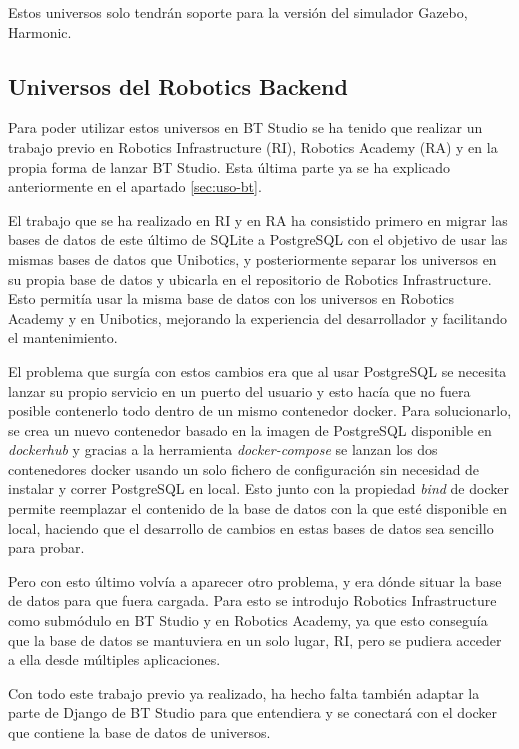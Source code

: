 Estos universos solo tendrán soporte para la versión del simulador Gazebo, Harmonic.

\subsection{Universos del Robotics Backend}

Para poder utilizar estos universos en BT Studio se ha tenido que realizar un trabajo previo en Robotics Infrastructure (RI), Robotics Academy (RA) y en la propia forma de lanzar BT Studio. Esta última parte ya se ha explicado anteriormente en el apartado \ref{sec:uso-bt}.

El trabajo que se ha realizado en RI y en RA ha consistido primero en migrar las bases de datos de este último de SQLite a PostgreSQL con el objetivo de usar las mismas bases de datos que Unibotics, y posteriormente separar los universos en su propia base de datos y ubicarla en el repositorio de Robotics Infrastructure. Esto permitía usar la misma base de datos con los universos en Robotics Academy y en Unibotics, mejorando la experiencia del desarrollador y facilitando el mantenimiento.

El problema que surgía con estos cambios era que al usar PostgreSQL se necesita lanzar su propio servicio en un puerto del usuario y esto hacía que no fuera posible contenerlo todo dentro de un mismo contenedor docker. Para solucionarlo, se crea un nuevo contenedor basado en la imagen de PostgreSQL disponible en \textit{dockerhub} y gracias a la herramienta \textit{docker-compose} se lanzan los dos contenedores docker usando un solo fichero de configuración sin necesidad de instalar y correr PostgreSQL en local. Esto junto con la propiedad \textit{bind} de docker permite reemplazar el contenido de la base de datos con la que esté disponible en local, haciendo que el desarrollo de cambios en estas bases de datos sea sencillo para probar.

Pero con esto último volvía a aparecer otro problema, y era dónde situar la base de datos para que fuera cargada. Para esto se introdujo Robotics Infrastructure como submódulo en BT Studio y en Robotics Academy, ya que esto conseguía que la base de datos se mantuviera en un solo lugar, RI, pero se pudiera acceder a ella desde múltiples aplicaciones.

Con todo este trabajo previo ya realizado, ha hecho falta también adaptar la parte de Django de BT Studio para que entendiera y se conectará con el docker que contiene la base de datos de universos.

